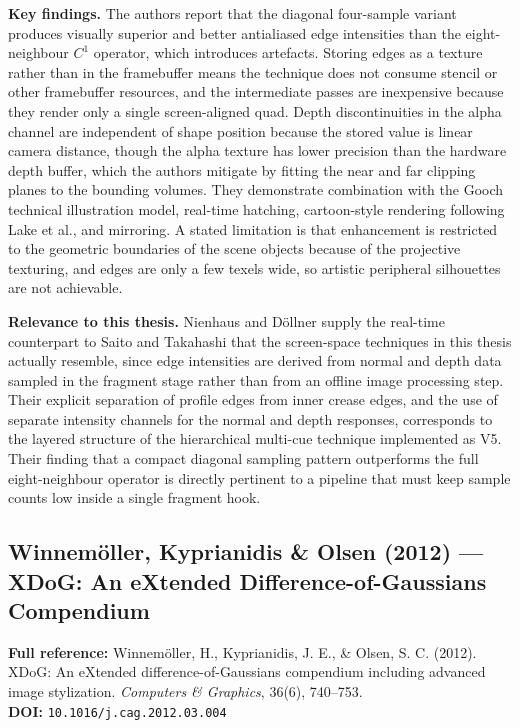\documentclass[11pt, a4paper]{article}
\begin{document}
\textbf{Key findings.} The authors report that the diagonal four-sample variant produces visually superior and better antialiased edge intensities than the eight-neighbour $C^1$ operator, which introduces artefacts. Storing edges as a texture rather than in the framebuffer means the technique does not consume stencil or other framebuffer resources, and the intermediate passes are inexpensive because they render only a single screen-aligned quad. Depth discontinuities in the alpha channel are independent of shape position because the stored value is linear camera distance, though the alpha texture has lower precision than the hardware depth buffer, which the authors mitigate by fitting the near and far clipping planes to the bounding volumes. They demonstrate combination with the Gooch technical illustration model, real-time hatching, cartoon-style rendering following Lake et al., and mirroring. A stated limitation is that enhancement is restricted to the geometric boundaries of the scene objects because of the projective texturing, and edges are only a few texels wide, so artistic peripheral silhouettes are not achievable.

\textbf{Relevance to this thesis.} Nienhaus and D\"{o}llner supply the real-time counterpart to Saito and Takahashi that the screen-space techniques in this thesis actually resemble, since edge intensities are derived from normal and depth data sampled in the fragment stage rather than from an offline image processing step. Their explicit separation of profile edges from inner crease edges, and the use of separate intensity channels for the normal and depth responses, corresponds to the layered structure of the hierarchical multi-cue technique implemented as V5. Their finding that a compact diagonal sampling pattern outperforms the full eight-neighbour operator is directly pertinent to a pipeline that must keep sample counts low inside a single fragment hook.

\vspace{8pt}

\subsection{Winnem\"{o}ller, Kyprianidis \& Olsen (2012) --- XDoG: An eXtended Difference-of-Gaussians Compendium}

\begin{refbox}
\textbf{Full reference:} Winnem\"{o}ller, H., Kyprianidis, J. E., \& Olsen, S. C. (2012). XDoG: An eXtended difference-of-Gaussians compendium including advanced image stylization. \textit{Computers \& Graphics}, 36(6), 740--753.\\
\textbf{DOI:} \texttt{10.1016/j.cag.2012.03.004}
\end{refbox}
\end{document}
